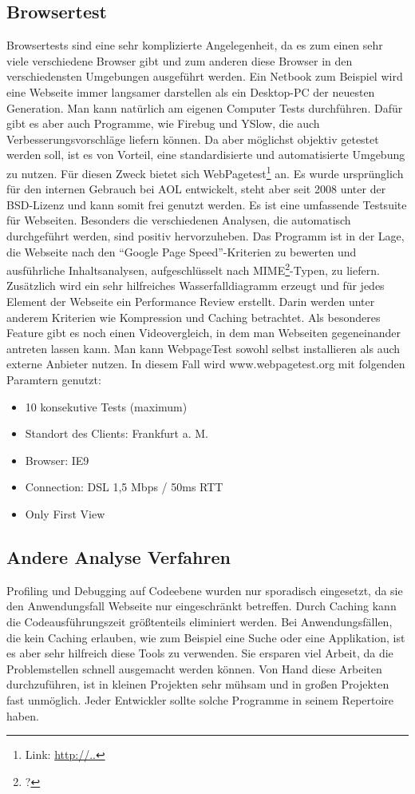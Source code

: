 \subsection{Browsertest}
Browsertests sind eine sehr komplizierte Angelegenheit, da es zum einen sehr viele verschiedene Browser gibt und zum anderen diese Browser in den verschiedensten Umgebungen ausgeführt werden. Ein Netbook zum Beispiel wird eine Webseite immer langsamer darstellen als ein Desktop-PC der neuesten Generation. Man kann natürlich am eigenen Computer Tests durchführen. Dafür gibt es aber auch Programme, wie Firebug und YSlow, die auch Verbesserungsvorschläge liefern können. Da aber möglichst objektiv getestet werden soll, ist es von Vorteil, eine standardisierte und automatisierte Umgebung zu nutzen. Für diesen Zweck bietet sich WebPagetest\footnote{Link: \url{http://..}} an. Es wurde ursprünglich für den internen Gebrauch bei AOL entwickelt, steht aber seit 2008 unter der BSD-Lizenz und kann somit frei genutzt werden. Es ist eine umfassende Testsuite für Webseiten. Besonders die verschiedenen Analysen, die automatisch durchgeführt werden, sind positiv hervorzuheben. Das Programm ist in der Lage, die Webseite nach den "`Google Page Speed"'-Kriterien zu bewerten und ausführliche Inhaltsanalysen, aufgeschlüsselt nach MIME\footnote{?}-Typen, zu liefern. Zusätzlich wird ein sehr hilfreiches Wasserfalldiagramm erzeugt und für jedes Element der Webseite ein Performance Review erstellt. Darin werden unter anderem Kriterien wie Kompression und Caching betrachtet. Als besonderes Feature gibt es noch einen Videovergleich, in dem man Webseiten gegeneinander antreten lassen kann. Man kann WebpageTest sowohl selbst installieren als auch externe Anbieter nutzen. In diesem Fall wird www.webpagetest.org mit folgenden Paramtern genutzt:
\begin{itemize}
  \item 10 konsekutive Tests (maximum) 
  \item Standort des Clients: Frankfurt a. M.
  \item Browser: IE9
  \item Connection: DSL 1,5 Mbps / 50ms RTT
  \item Only First View %
\end{itemize}
\subsection{Andere Analyse Verfahren}
Profiling und Debugging auf Codeebene wurden nur sporadisch eingesetzt, da sie den Anwendungsfall Webseite nur eingeschränkt betreffen. Durch Caching kann die Codeausführungszeit größtenteils eliminiert werden. Bei Anwendungsfällen, die kein Caching erlauben, wie zum Beispiel eine Suche oder eine Applikation, ist es aber sehr hilfreich diese Tools zu verwenden. Sie ersparen viel Arbeit, da die Problemstellen schnell ausgemacht werden können. Von Hand diese Arbeiten durchzuführen, ist in kleinen Projekten sehr mühsam und in großen Projekten fast unmöglich. Jeder Entwickler sollte solche Programme in seinem Repertoire haben.
